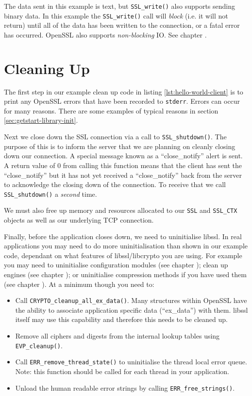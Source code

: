 The data sent in this example is text, but \verb!SSL_write()! also supports 
sending binary data. In this example the \verb!SSL_write()! call will
\emph{block} (i.e. it will not return) until all of the data has been written
to the connection, or a fatal error has occurred. OpenSSL also supports
\emph{non-blocking} IO. See chapter .

\section{Cleaning Up}

The first step in our example clean up code in listing
\ref{lst:hello-world-client} is to print any OpenSSL errors that have been 
recorded to \verb!stderr!. Errors can occur for many reasons. There are some
examples of typical reasons in section \ref{sec:getstart-library-init}.

Next we close down the SSL connection via a call to \verb!SSL_shutdown()!. The 
purpose of this is to inform the server that we are planning on cleanly closing 
down our connection. A special message known as a ``close\_notify'' alert is 
sent. A return value of 0 from calling this function means that the client has 
sent the ``close\_notify'' but it has not yet received a ``close\_notify'' back 
from the server to acknowledge the closing down of the connection. To receive 
that we call \verb!SSL_shutdown()! a \emph{second} time.

We must also free up memory and resources allocated to our \verb!SSL! and
\verb!SSL_CTX! objects as well as our underlying TCP connection.

Finally, before the application closes down, we need to uninitialise libssl. In 
real applications you may need to do more uninitialisation than shown in our 
example code, dependant on what features of libssl/libcrypto you are using. For 
example you may need to uninitialise configuration modules (see chapter
); clean up engines (see chapter ); or
uninitialise compression methods if you have used them (see chapter ). 
At a minimum though you need to:
\begin{itemize}
\item Call \texttt{CRYPTO\_cleanup\_all\_ex\_data()}. Many structures within
OpenSSL have the ability to associate application specific data  (``ex\_data'')
with them. libssl itself may use this capability and therefore  this needs to be
cleaned up.
\item Remove all ciphers and digests from the internal lookup tables using 
\texttt{EVP\_cleanup()}.
\item Call \texttt{ERR\_remove\_thread\_state()} to uninitialise the thread
local error queue. Note: this function should be called for each thread in your
application.
\item Unload the human readable error strings by calling 
\texttt{ERR\_free\_strings()}.
\end{itemize}

